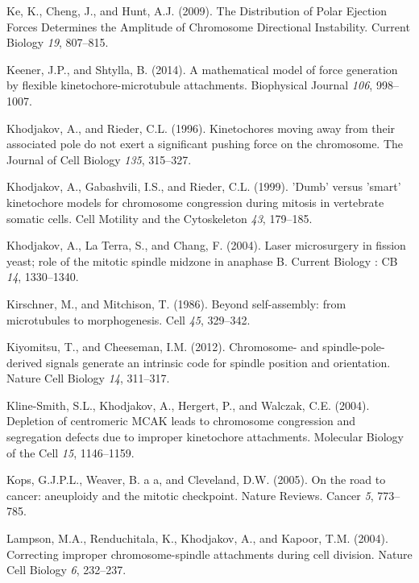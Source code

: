 \documentclass[12pt,a4paper,twoside,openright]{book}
\begin{document}
\hypertarget{ref-Ke2009}{}
Ke, K., Cheng, J., and Hunt, A.J. (2009). The Distribution of Polar
Ejection Forces Determines the Amplitude of Chromosome Directional
Instability. Current Biology \emph{19}, 807--815.

\hypertarget{ref-Keener2014}{}
Keener, J.P., and Shtylla, B. (2014). A mathematical model of force
generation by flexible kinetochore-microtubule attachments. Biophysical
Journal \emph{106}, 998--1007.

\hypertarget{ref-Khodjakov1996}{}
Khodjakov, A., and Rieder, C.L. (1996). Kinetochores moving away from
their associated pole do not exert a significant pushing force on the
chromosome. The Journal of Cell Biology \emph{135}, 315--327.

\hypertarget{ref-Khodjakov1999}{}
Khodjakov, A., Gabashvili, I.S., and Rieder, C.L. (1999). 'Dumb' versus
'smart' kinetochore models for chromosome congression during mitosis in
vertebrate somatic cells. Cell Motility and the Cytoskeleton \emph{43},
179--185.

\hypertarget{ref-Khodjakov2004}{}
Khodjakov, A., La Terra, S., and Chang, F. (2004). Laser microsurgery in
fission yeast; role of the mitotic spindle midzone in anaphase B.
Current Biology : CB \emph{14}, 1330--1340.

\hypertarget{ref-Kirschner1986}{}
Kirschner, M., and Mitchison, T. (1986). Beyond self-assembly: from
microtubules to morphogenesis. Cell \emph{45}, 329--342.

\hypertarget{ref-Kiyomitsu2012}{}
Kiyomitsu, T., and Cheeseman, I.M. (2012). Chromosome- and
spindle-pole-derived signals generate an intrinsic code for spindle
position and orientation. Nature Cell Biology \emph{14}, 311--317.

\hypertarget{ref-Kline-Smith2004}{}
Kline-Smith, S.L., Khodjakov, A., Hergert, P., and Walczak, C.E. (2004).
Depletion of centromeric MCAK leads to chromosome congression and
segregation defects due to improper kinetochore attachments. Molecular
Biology of the Cell \emph{15}, 1146--1159.

\hypertarget{ref-Kops2005}{}
Kops, G.J.P.L., Weaver, B. a a, and Cleveland, D.W. (2005). On the road
to cancer: aneuploidy and the mitotic checkpoint. Nature Reviews. Cancer
\emph{5}, 773--785.

\hypertarget{ref-Lampson2004}{}
Lampson, M.A., Renduchitala, K., Khodjakov, A., and Kapoor, T.M. (2004).
Correcting improper chromosome-spindle attachments during cell division.
Nature Cell Biology \emph{6}, 232--237.
\end{document}

